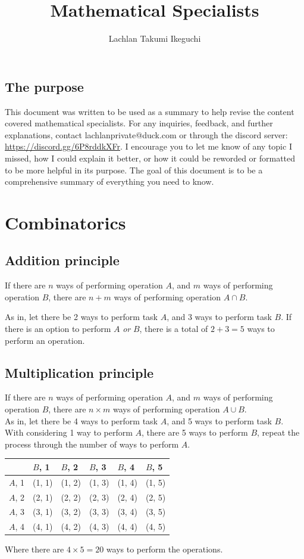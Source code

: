 \documentclass{book}
\title{Mathematical Specialists}
\author{Lachlan Takumi Ikeguchi}
\begin{document}
\maketitle
\tableofcontents

\section{The purpose}
This document was written to be used as a summary to help revise the content covered mathematical specialists.  For any inquiries, feedback, and further explanations, contact lachlanprivate@duck.com or through the discord server: \url{https://discord.gg/6P8rddkXFr}.  I encourage you to let me know of any topic I missed, how I could explain it better, or how it could be reworded or formatted to be more helpful in its purpose.  The goal of this document is to be a comprehensive summary of everything you need to know.



\chapter{Combinatorics}
\section{Addition principle}
If there are $n$ ways of performing operation $A$, and $m$ ways of performing operation $B$, there are $n + m$ ways of performing operation $A \cap B$.

As in, let there be 2 ways to perform task $A$, and 3 ways to perform task $B$.  If there is an option to perform $A$ \emph{or} $B$, there is a total of $2 + 3 = 5$ ways to perform an operation.

\section{Multiplication principle}
If there are $n$ ways of performing operation $A$, and $m$ ways of performing operation $B$, there are $n \times m$ ways of performing operation $A \cup B$.\\

As in, let there be 4 ways to perform task $A$, and 5 ways to perform task $B$.  With considering 1 way to perform $A$, there are 5 ways to perform $B$, repeat the process through the number of ways to perform $A$.

\begin{center}
	\begin{tabular}{l|lllll}
		       & $B$, 1 & $B$, 2 & $B$, 3 & $B$, 4 & $B$, 5 \\ \hline
		$A$, 1 & (1, 1) & (1, 2) & (1, 3) & (1, 4) & (1, 5) \\
		$A$, 2 & (2, 1) & (2, 2) & (2, 3) & (2, 4) & (2, 5) \\
		$A$, 3 & (3, 1) & (3, 2) & (3, 3) & (3, 4) & (3, 5) \\
		$A$, 4 & (4, 1) & (4, 2) & (4, 3) & (4, 4) & (4, 5) \\
	\end{tabular}
\end{center}
Where there are $4 \times 5 = 20$ ways to perform the operations.
\end{document}
